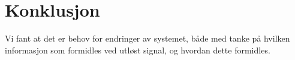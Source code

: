 \chapter{Konklusjon}
\label{chp:konklusjon}
Vi fant at det er behov for endringer av systemet, både med tanke på hvilken informasjon som formidles ved utløst signal, og hvordan dette formidles.